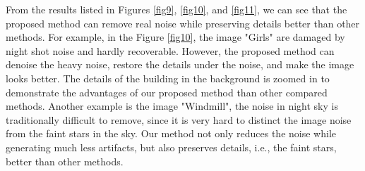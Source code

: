\documentclass[runningheads]{llncs}
\begin{document}
From the results listed in Figures \ref{fig9}, \ref{fig10}, and \ref{fig11}, we can see that the proposed method can remove real noise while preserving details better than other methods. For example, in the Figure \ref{fig10}, the image "Girls" are damaged by night shot noise and hardly recoverable. However, the proposed method can denoise the heavy noise, restore the details under the noise, and make the image looks better. The details of the building in the background is zoomed in to demonstrate the advantages of our proposed method than other compared methods. Another example is the image "Windmill", the noise in night sky is traditionally difficult to remove, since it is very hard to distinct the image noise from the faint stars in the sky. Our method not only reduces the noise while generating much less artifacts, but also preserves details, i.e., the faint stars, better than other methods.
\vspace{-0.1in}
\end{document}
